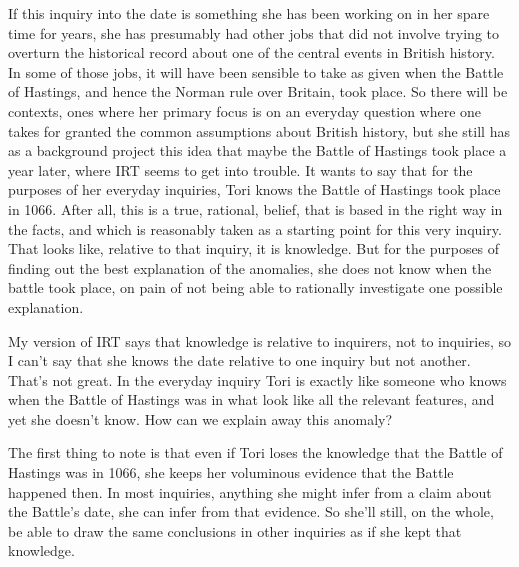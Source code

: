 \documentclass[
  10pt,
  letterpaper,
  twoside]{scrbook}
\begin{document}
If this inquiry into the date is something she has been working on in
her spare time for years, she has presumably had other jobs that did not
involve trying to overturn the historical record about one of the
central events in British history. In some of those jobs, it will have
been sensible to take as given when the Battle of Hastings, and hence
the Norman rule over Britain, took place. So there will be contexts,
ones where her primary focus is on an everyday question where one takes
for granted the common assumptions about British history, but she still
has as a background project this idea that maybe the Battle of Hastings
took place a year later, where IRT seems to get into trouble. It wants
to say that for the purposes of her everyday inquiries, Tori knows the
Battle of Hastings took place in 1066. After all, this is a true,
rational, belief, that is based in the right way in the facts, and which
is reasonably taken as a starting point for this very inquiry. That
looks like, relative to that inquiry, it is knowledge. But for the
purposes of finding out the best explanation of the anomalies, she does
not know when the battle took place, on pain of not being able to
rationally investigate one possible explanation.

My version of IRT says that knowledge is relative to inquirers, not to
inquiries, so I can't say that she knows the date relative to one
inquiry but not another. That's not great. In the everyday inquiry Tori
is exactly like someone who knows when the Battle of Hastings was in
what look like all the relevant features, and yet she doesn't know. How
can we explain away this anomaly?

The first thing to note is that even if Tori loses the knowledge that
the Battle of Hastings was in 1066, she keeps her voluminous evidence
that the Battle happened then. In most inquiries, anything she might
infer from a claim about the Battle's date, she can infer from that
evidence. So she'll still, on the whole, be able to draw the same
conclusions in other inquiries as if she kept that knowledge.
\end{document}
